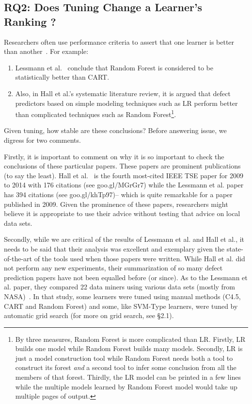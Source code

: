 \documentclass[final,twocolumn,5p]{elsarticle}
\newcommand{\be}{\begin{enumerate}}
\newcommand{\ee}{\end{enumerate}}
\begin{document}
\subsection{RQ2:  Does Tuning Change a Learner's Ranking ?}\label{sect:rank}
Researchers often use performance criteria to assert that one learner is better than 
another~\cite{lessmann2008benchmarking,me07b,hall11}. For example:
\be
\item
Lessmann et al.~\cite{lessmann2008benchmarking} conclude that
Random Forest is considered to be statistically 
better than CART. 
\item
Also, in Hall et al.'s   systematic literature review\cite{hall11}, it is argued
that defect predictors based on simple 
modeling techniques such as LR perform better than complicated techniques such as Random Forest\footnote{By three measures,
Random Forest
is more complicated than LR. Firstly, LR builds one model
while Random Forest builds many models. Secondly, LR is just
a model construction tool while Random Forest needs both
a tool to construct its forest {\em and} a second tool
to  infer some conclusion from all the members of that forest.
Thirdly, the LR model can be printed in a few lines while the multiple
models learned by Random
Forest model would take up multiple pages of output.}.
\ee
Given tuning, how stable are these  conclusions?
Before answering issue, we digress for two comments.



Firstly, it is important to comment on why it is  so important to check the conclusions
of these particular papers. 
These  papers are prominent publications (to say the least).
Hall et al.~\cite{hall11} is the fourth most-cited IEEE TSE
paper for 2009 to 2014 with 176 citations (see goo.gl/MGrGr7)
while the Lessmann et al. paper~\cite{lessmann2008benchmarking} has 394 citations (see
goo.gl/khTp97)-- which is quite remarkable for a paper published in 2009.
Given the prominence
of these papers, researchers might believe it is
appropriate to
  use  their advice without testing that advice on local data sets.

Secondly, while we are critical of the results of
Lessmann et al. and Hall et al., it needs to be said that  their analysis  was 
excellent and exemplary given the state-of-the-art of the tools used when those papers were written.  
While Hall et al. did not perform any new experiments, 
their
summarization of so many defect prediction papers have not been equalled
before (or since).
As to the Lessmann et al. paper, they  compared
22 data miners using various   data sets (mostly from NASA)~\cite{lessmann2008benchmarking}.
In that study, some learners were tuned using manual methods 
(C4.5, CART and Random Forest)
and some, like SVM-Type learners, were tuned by automatic grid search (for more on grid search, see   {\S}2.1).
\end{document}
